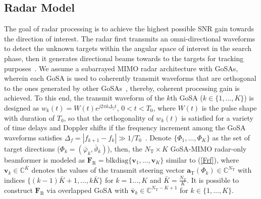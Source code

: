 \documentclass[journal,10pt]{IEEEtran}
\begin{document}
	\subsection{Radar Model}
	The goal of radar processing is to achieve the highest possible SNR gain towards the direction of interest. The radar first transmits an omni-directional waveforms  to detect the unknown targets within the angular space of interest in the search phase, then it generates directional beams towards to the targets for tracking purposes~\cite{radarCommSurvey}. We assume a subarrayed MIMO radar architecture with GoSAs, wherein each GoSA is used to coherently transmit waveforms that are orthogonal to the ones generated by other GoSAs~\cite{phasedArrayMIMOradar}, thereby, coherent processing gain is achieved. To this end, the transmit waveform of the $k$th GoSA ($k\in \{1,\dots, K\}$) is designed as $w_k(t) = W(t)e^{j2\pi k \Delta_ft}$, $0<t<T_0$, where $W(t)$ is the pulse shape with duration of $T_0$, so that the orthogonality of $w_k(t)$ is satisfied for a variety of time delays and Doppler shifts if the frequency increment among the GoSA waveforms satisfies $\Delta_f = | f_{k+1} - f_k | \gg 1/T_0$~\cite{phasedArrayMIMOradar}. Denote $\{\Phi_1,\dots, \Phi_K\}$ as the set of target directions ($\Phi_k = (\bar{\varphi}_k,\bar{\vartheta}_k)$), then, the $N_\mathrm{T}\times K$ GoSA-MIMO radar-only beamformer is modeled as $\mathbf{F}_\mathrm{R} = \mathrm{blkdiag}\{	{\mathbf{v}}_1,\dots, 	{\mathbf{v}}_K\}$ similar to (\ref{Frf}),
	where $\mathbf{v}_k\in \mathbb{C}^{\bar{K}}$ denotes the values of the transmit steering vector $\mathbf{a}_\mathrm{T}(\Phi_k)\in \mathbb{C}^{N_\mathrm{T}}$  with indices $\{(k-1)\bar{K}+1,\dots, k\bar{K}\}$ for $k = 1\dots, K$ and $\bar{K} = \frac{N_\mathrm{T}}{K}$. It is possible to construct $\mathbf{F}_\mathrm{R}$ via overlapped GoSA with $\bar{\mathbf{v}}_k\in \mathbb{C}^{N_\mathrm{T} - K +1}$ for $k \in \{1,\dots,K\}$.
	
\end{document}
